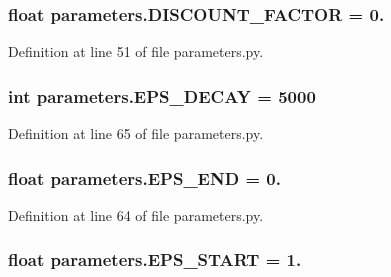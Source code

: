 \subsubsection[{\texorpdfstring{D\+I\+S\+C\+O\+U\+N\+T\+\_\+\+F\+A\+C\+T\+OR}{DISCOUNT_FACTOR}}]{\setlength{\rightskip}{0pt plus 5cm}float parameters.\+D\+I\+S\+C\+O\+U\+N\+T\+\_\+\+F\+A\+C\+T\+OR = 0.}\hypertarget{namespaceparameters_a70176024e0f585c846365800f1c7819c}{}\label{namespaceparameters_a70176024e0f585c846365800f1c7819c}


Definition at line 51 of file parameters.\+py.

\subsubsection[{\texorpdfstring{E\+P\+S\+\_\+\+D\+E\+C\+AY}{EPS_DECAY}}]{\setlength{\rightskip}{0pt plus 5cm}int parameters.\+E\+P\+S\+\_\+\+D\+E\+C\+AY = 5000}\hypertarget{namespaceparameters_ab9a88c663385563b35331bbea5c4a74b}{}\label{namespaceparameters_ab9a88c663385563b35331bbea5c4a74b}


Definition at line 65 of file parameters.\+py.

\subsubsection[{\texorpdfstring{E\+P\+S\+\_\+\+E\+ND}{EPS_END}}]{\setlength{\rightskip}{0pt plus 5cm}float parameters.\+E\+P\+S\+\_\+\+E\+ND = 0.}\hypertarget{namespaceparameters_a3765f189d3af4815766ded3bffcba1e2}{}\label{namespaceparameters_a3765f189d3af4815766ded3bffcba1e2}


Definition at line 64 of file parameters.\+py.

\subsubsection[{\texorpdfstring{E\+P\+S\+\_\+\+S\+T\+A\+RT}{EPS_START}}]{\setlength{\rightskip}{0pt plus 5cm}float parameters.\+E\+P\+S\+\_\+\+S\+T\+A\+RT = 1.}\hypertarget{namespaceparameters_a371d0de003e9046dcc72450b7512ce14}{}\label{namespaceparameters_a371d0de003e9046dcc72450b7512ce14}


